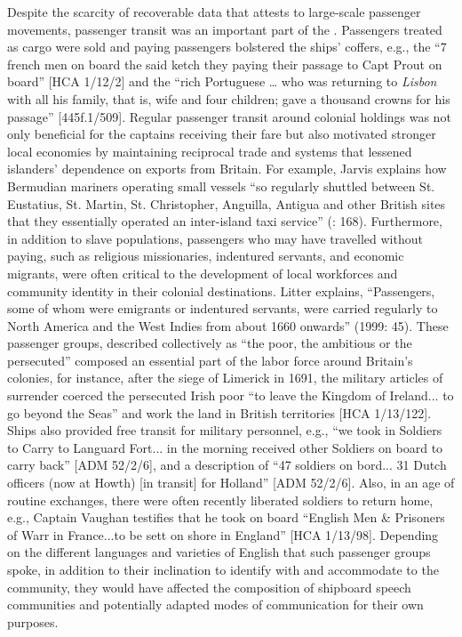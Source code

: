 Despite the scarcity of recoverable data that attests to large-scale passenger movements, passenger transit was an important part of the . Passengers treated as cargo were sold and paying passengers bolstered the ships’ coffers, e.g., the “7 french men on board the said ketch they paying their passage to Capt Prout on board” [HCA 1/12/2] and the “rich Portuguese … who was returning to \textit{Lisbon} with all his family, that is, wife and four children; gave a thousand crowns for his passage” [445f.1/509]. Regular passenger transit around colonial holdings was not only beneficial for the captains receiving their fare but also motivated stronger local economies by maintaining reciprocal trade and  systems that lessened islanders’ dependence on exports from Britain. For example, Jarvis explains how Bermudian mariners operating small vessels “so regularly shuttled between St. Eustatius, St. Martin, St. Christopher, Anguilla, Antigua and other British sites that they essentially operated an inter-island taxi service” (\citealt{Jarvis2010}: 168). Furthermore, in addition to slave populations, passengers who may have travelled without paying, such as religious missionaries, indentured servants, and economic migrants, were often critical to the development of local workforces and community identity in their colonial destinations. Litter explains, “Passengers, some of whom were emigrants or indentured servants, were carried regularly to North America and the West Indies from about 1660 onwards” (1999: 45). These passenger groups, described collectively as “the poor, the ambitious or the persecuted” \citep[45]{Litter1999} composed an essential part of the labor force around Britain's colonies, for instance, after the siege of Limerick in 1691, the military articles of surrender coerced the persecuted Irish poor “to leave the Kingdom of Ireland... to go beyond the Seas” and work the land in British territories [HCA 1/13/122]. Ships also provided free transit for military personnel, e.g., “we took in Soldiers to Carry to Languard Fort... in the morning received other Soldiers on board to carry back” [ADM 52/2/6], and a description of “47 soldiers on bord... 31 Dutch officers (now at Howth) [in transit] for Holland” [ADM 52/2/6]. Also, in an age of routine  exchanges, there were often recently liberated soldiers to return home, e.g., Captain Vaughan testifies that he took on board “English Men \& Prisoners of Warr in France...to be sett on shore in England” [HCA 1/13/98]. Depending on the different languages and varieties of English that such passenger groups spoke, in addition to their inclination to identify with and accommodate to the  community, they would have affected the composition of shipboard speech communities and potentially adapted modes of communication for their own purposes. 


